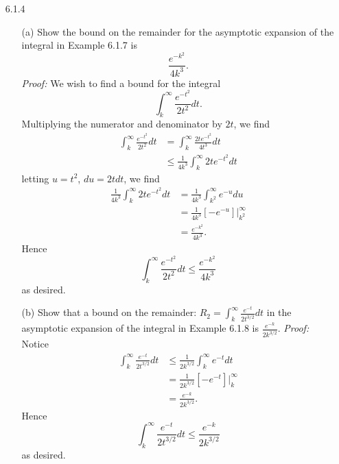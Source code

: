 \documentclass{article}
\begin{document}
\begin{itemize}
    \item[6.1.4] 
    \begin{itemize}
        \item[(a)] Show the bound on the remainder for the asymptotic expansion of the integral in Example 6.1.7 is
        \[\frac{e^{-k^2}}{4k^3}.\]
        \textit{Proof:} We wish to find a bound for the integral
        \[\int_k^{\infty}\frac{e^{-t^2}}{2t^2}dt.\]
        Multiplying the numerator and denominator by $2t$, we find
        \begin{align*}
            \int_k^{\infty}\frac{e^{-t^2}}{2t^2}dt &= \int_k^{\infty}\frac{2te^{-t^2}}{4t^3}dt\\
            &\leq \frac{1}{4k^3}\int_k^{\infty}2te^{-t^2}dt
        \end{align*}
        letting $u = t^2$, $du = 2tdt$, we find
        \begin{align*}
            \frac{1}{4k^3}\int_k^{\infty}2te^{-t^2}dt &= \frac{1}{4k^3}\int_{k^2}^{\infty}e^{-u}du\\
            &= \frac{1}{4k^3}\left[-e^{-u}\right]\bigg|_{k^2}^{\infty}\\
            &= \frac{e^{-k^2}}{4k^3}.
        \end{align*}
        Hence
        \[\int_k^{\infty}\frac{e^{-t^2}}{2t^2}dt \leq \frac{e^{-k^2}}{4k^3}\]
        as desired.
        \newline

        \item[(b)] Show that a bound on the remainder: ${\displaystyle R_2 = \int_k^{\infty} \frac{e^{-t}}{2t^{3/2}}dt }$ in the asymptotic expansion of the integral in Example 6.1.8 is $\frac{e^{-k}}{2k^{3/2}}.$
        \newline\newline
        \textit{Proof:} Notice 
        \begin{align*}
            \int_{k}^{\infty} \frac{e^{-t}}{2t^{3/2}}dt &\leq \frac{1}{2k^{3/2}}\int_k^{\infty}e^{-t}dt\\
            &= \frac{1}{2k^{3/2}}\left[-e^{-t}\right]\bigg|_k^{\infty}\\
            &= \frac{e^{-k}}{2k^{3/2}}.
        \end{align*}
        Hence
        \[\int_k^{\infty}\frac{e^{-t}}{2t^{3/2}}dt \leq \frac{e^{-k}}{2k^{3/2}}\]
        as desired.
        
    \end{itemize}
    \pagebreak


\end{itemize}
\end{document}
